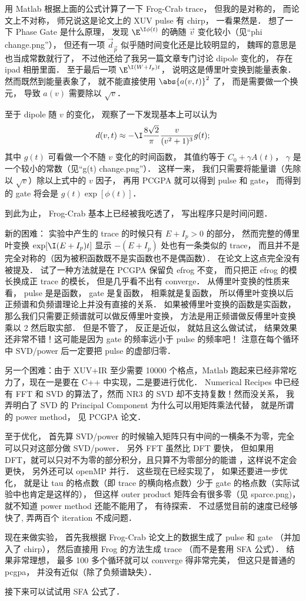 用 Matlab 根据上面的公式计算了一下 Frog-Crab trace， 但我的是对称的， 而论文上不对称， 师兄说这是论文上的 XUV pulse 有 chirp， 一看果然是． 想了一下 Phase Gate 是什么原理， 发现 $\E^{\I\phi(t)}$ 的确随 $\vec v$ 变化较小（见“phi change.png”）， 但还有一项 $\vec d_{\vec p}$ 似乎随时间变化还是比较明显的， 魏晖的意思是也当成常数就行了， 不过他还给了我另一篇文章专门讨论 dipole 变化的， 存在 ipad 相册里面． 至于最后一项 $\E^{\I(W+I_p)t}$， 说明这是傅里叶变换到能量表象．然而既然到能量表象了， 就不能直接使用 $\abs{a(v, t)}^2$ 了， 而是需要做一个换元， 导致 $a(v)$ 需要除以 $\sqrt{v}$．

至于 dipole 随 $v$ 的变化， 观察了一下发现基本上可以认为
\begin{equation}
d(v, t) \approx -\I \frac{8\sqrt2}{\pi} \frac{v}{(v^2+1)^3} g(t);
\end{equation}
其中 $g(t)$ 可看做一个不随 $v$ 变化的时间函数， 其值约等于 $C_0 + \gamma A(t)$， $\gamma$ 是一个较小的常数（见“g(t) change.png”）． 这样一来， 我们只需要将能量谱（先除以 $\sqrt{v}$）除以上式中的 $v$ 因子， 再用 PCGPA 就可以得到 pulse 和 gate， 而得到的 gate 将会是 $g(t)\exp[\phi(t)]$．

到此为止， Frog-Crab 基本上已经被我吃透了， 写出程序只是时间问题．

新的困难： 实验中产生的 trace 的时候只有 $E + I_p > 0$ 的部分， 然而完整的傅里叶变换  $\exp[\I (E + I_p) t]$ 显示 $-(E + I_p)$ 处也有一条类似的 trace， 而且并不是完全对称的（因为被积函数既不是实函数也不是偶函数）． 在论文上这点完全没有被提及． 试了一种方法就是在 PCGPA 保留负 efrog 不变， 而只把正 efrog 的模长换成正 trace 的模长， 但是几乎看不出有 converge． 从傅里叶变换的性质来看， pulse 是是函数， gate 是复函数， 相乘就是复函数， 所以傅里叶变换以后正频谱和负频谱理论上并没有直接的关系． 如果被傅里叶变换的函数是实函数， 那么我们只需要正频谱就可以做反傅里叶变换， 方法是用正频谱做反傅里叶变换乘以 2 然后取实部． 但是不管了， 反正是近似， 就姑且这么做试试， 结果效果还非常不错！这可能是因为 gate 的频率远小于 pulse 的频率吧！ 注意在每个循环中 SVD/power 后一定要把 pulse 的虚部归零．

另一个困难：由于 XUV+IR 至少需要 10000 个格点，Matlab 跑起来已经非常吃力了，现在一是要在 C++ 中实现，二是要进行优化． Numerical Recipes 中已经有 FFT 和 SVD 的算法了，然而 NR3 的 SVD 却不支持复数！然而没关系， 我弄明白了 SVD 的 Principal Component 为什么可以用矩阵乘法代替， 就是所谓的 power method， 见 PCGPA 论文．

至于优化， 首先算 SVD/power 的时候输入矩阵只有中间的一横条不为零，完全可以只对这部分做 SVD/power． 另外 FFT 虽然比 DFT 要快， 但如果用 DFT，就可以只对不为零的部分积分，且只算不为零部分的能谱 ，这样说不定会更快， 另外还可以 openMP 并行． 这些现在已经实现了， 如果还要进一步优化， 就是让 tau 的格点数（即 trace 的横向格点数）少于 gate 的格点数（实际试验中也肯定是这样的）， 但这样 outer product 矩阵会有很多零（见 sparce.png)， 就不知道 power method 还能不能用了， 有待探索． 不过感觉目前的速度已经够快了, 弄两百个 iteration 不成问题．

现在来做实验， 首先我根据 Frog-Crab 论文上的数据生成了 pulse 和 gate （并加入了 chirp）， 然后直接用 Frog 的方法生成 trace （而不是套用 SFA 公式）． 结果非常理想， 最多 100 多个循环就可以 converge 得非常完美， 但这只是普通的 pcgpa， 并没有近似（除了负频谱缺失）．

接下来可以试试用 SFA 公式了．








